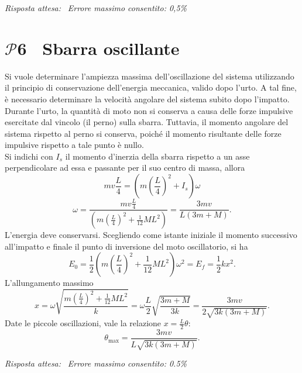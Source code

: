 \documentclass[a4paper,12pt]{article}
\newcommand{\problemtitle}[1]{
  \noindent
  \textbf{\Large #1}\hspace{0.5em}
  \raisebox{0.6ex}{\rule{\linewidth - \widthof{\textbf{\Large #1}} - 0.6em}{0.4pt}}%
}
\begin{document}
\textit{Risposta attesa:}  \, \textit{Errore massimo consentito: 0,5\%}

\section*{\problemtitle{$\mathcal{P}${\small{6}} \ Sbarra oscillante}}
Si vuole determinare l’ampiezza massima dell’oscillazione del sistema utilizzando il principio di conservazione dell’energia meccanica, valido dopo l’urto. A tal fine, è necessario determinare la velocità angolare del sistema subito dopo l’impatto. \\
Durante l’urto, la quantità di moto non si conserva a causa delle forze impulsive esercitate dal vincolo (il perno) sulla sbarra. Tuttavia, il momento angolare del sistema rispetto al perno si conserva, poiché il momento risultante delle forze impulsive rispetto a tale punto è nullo. \\
Si indichi con \( I_s \) il momento d’inerzia della sbarra rispetto a un asse perpendicolare ad essa e passante per il suo centro di massa, allora
\[
mv\frac{L}{4} = \left(m\left(\frac{L}{4}\right)^2 + I_s\right)\omega \tag{6.0}
\]
\[
 \omega = \frac{mv\frac{L}{4}}{\left(m\left(\frac{L}{4}\right)^2 + \frac{1}{12}ML^2\right)} = \frac{3mv}{L\left(3m+M\right)}. \tag{6.1}
\]
L'energia deve conservarsi. Scegliendo come istante iniziale il momento successivo all'impatto e finale il punto di inversione del moto oscillatorio, si ha
\[
E_0 = \frac{1}{2}\left(m\left(\frac{L}{4}\right)^2 + \frac{1}{12}ML^2\right)\omega^2 = E_f = \frac{1}{2}kx^2. \tag{6.2}
\]
L'allungamento massimo
\[
x = \omega \sqrt{\frac{m\left(\frac{L}{4}\right)^2 + \frac{1}{12}ML^2}{k}} = \omega \frac{L}{2}\sqrt{\frac{3m+M}{3k}} = \frac{3mv}{2\sqrt{3k(3m+M)}}. \tag{6.3}
\]
Date le piccole oscillazioni, vale la relazione $x = \frac{L}{2}\theta$:
\[
\theta_{\text{max}} = \frac{3mv}{L\sqrt{3k(3m+M)}}. \tag{6.4}
\]

\textit{Risposta attesa:}  \, \textit{Errore massimo consentito: 0.5\%}
\end{document}
